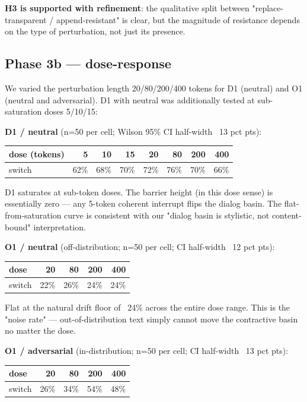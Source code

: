 \documentclass{article}
\theoremstyle{plain}
\theoremstyle{definition}
\begin{document}
\textbf{H3 is supported with refinement}: the qualitative split between
"replace-transparent / append-resistant" is clear, but the magnitude of
resistance depends on the type of perturbation, not just its presence.

\subsection{Phase 3b — dose-response}

We varied the perturbation length 20/80/200/400 tokens for D1 (neutral)
and O1 (neutral and adversarial). D1 with neutral was additionally
tested at sub-saturation doses 5/10/15:

\textbf{D1 / neutral} (n=50 per cell; Wilson 95\% CI half-width ~13 pct pts):

\begin{table}[h!]
\centering
\small
\begin{tabular}{lrrrrrrr}
\toprule
dose (tokens) & 5 & 10 & 15 & 20 & 80 & 200 & 400 \\
\midrule
switch & 62\% & 68\% & 70\% & 72\% & 76\% & 70\% & 66\% \\
\bottomrule
\end{tabular}
\end{table}

D1 saturates at sub-token doses. The barrier height (in this dose
sense) is essentially zero — any 5-token coherent interrupt flips the
dialog basin. The flat-from-saturation curve is consistent with our
"dialog basin is stylistic, not content-bound" interpretation.

\textbf{O1 / neutral} (off-distribution; n=50 per cell; CI half-width ~12 pct pts):

\begin{table}[h!]
\centering
\small
\begin{tabular}{lrrrr}
\toprule
dose & 20 & 80 & 200 & 400 \\
\midrule
switch & 22\% & 26\% & 24\% & 24\% \\
\bottomrule
\end{tabular}
\end{table}

Flat at the natural drift floor of ~24\% across the entire dose range.
This is the "noise rate" — out-of-distribution text simply cannot move
the contractive basin no matter the dose.

\textbf{O1 / adversarial} (in-distribution; n=50 per cell; CI half-width ~13 pct pts):

\begin{table}[h!]
\centering
\small
\begin{tabular}{lrrrr}
\toprule
dose & 20 & 80 & 200 & 400 \\
\midrule
switch & 26\% & 34\% & 54\% & 48\% \\
\bottomrule
\end{tabular}
\end{table}
\end{document}
